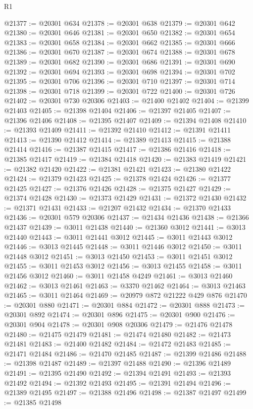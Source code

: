 \begin{lexlean}{R1}
\begin{coremodule}
@21377 := @20301 @634
@21378 := @20301 @638
@21379 := @20301 @642
@21380 := @20301 @646
@21381 := @20301 @650
@21382 := @20301 @654
@21383 := @20301 @658
@21384 := @20301 @662
@21385 := @20301 @666
@21386 := @20301 @670
@21387 := @20301 @674
@21388 := @20301 @678
@21389 := @20301 @682
@21390 := @20301 @686
@21391 := @20301 @690
@21392 := @20301 @694
@21393 := @20301 @698
@21394 := @20301 @702
@21395 := @20301 @706
@21396 := @20301 @710
@21397 := @20301 @714
@21398 := @20301 @718
@21399 := @20301 @722
@21400 := @20301 @726
@21402 := @20301 @730 @20306
@21403 := @21400 @21402
@21404 := @21399 @21403
@21405 := @21398 @21404
@21406 := @21397 @21405
@21407 := @21396 @21406
@21408 := @21395 @21407
@21409 := @21394 @21408
@21410 := @21393 @21409
@21411 := @21392 @21410
@21412 := @21391 @21411
@21413 := @21390 @21412
@21414 := @21389 @21413
@21415 := @21388 @21414
@21416 := @21387 @21415
@21417 := @21386 @21416
@21418 := @21385 @21417
@21419 := @21384 @21418
@21420 := @21383 @21419
@21421 := @21382 @21420
@21422 := @21381 @21421
@21423 := @21380 @21422
@21424 := @21379 @21423
@21425 := @21378 @21424
@21426 := @21377 @21425
@21427 := @21376 @21426
@21428 := @21375 @21427
@21429 := @21374 @21428
@21430 := @21373 @21429
@21431 := @21372 @21430
@21432 := @21371 @21431
@21433 := @21207 @21432
@21434 := @21370 @21433
@21436 := @20301 @579 @20306
@21437 := @21434 @21436
@21438 := @21366 @21437
@21439 := @3011 @21438
@21440 := @21360 @3012
@21441 := @3013 @21440
@21443 := @3011 @21441 @3012
@21445 := @3011 @21443 @3012
@21446 := @3013 @21445
@21448 := @3011 @21446 @3012
@21450 := @3011 @21448 @3012
@21451 := @3013 @21450
@21453 := @3011 @21451 @3012
@21455 := @3011 @21453 @3012
@21456 := @3013 @21455
@21458 := @3011 @21456 @3012
@21460 := @3011 @21458 @4249
@21461 := @3013 @21460
@21462 := @3013 @21461
@21463 := @3370 @21462
@21464 := @3013 @21463
@21465 := @3011 @21464
@21469 := @20979 @872 @21222 @429 @876
@21470 := @20301 @880
@21471 := @20301 @884
@21472 := @20301 @888
@21473 := @20301 @892
@21474 := @20301 @896
@21475 := @20301 @900
@21476 := @20301 @904
@21478 := @20301 @908 @20306
@21479 := @21476 @21478
@21480 := @21475 @21479
@21481 := @21474 @21480
@21482 := @21473 @21481
@21483 := @21400 @21482
@21484 := @21472 @21483
@21485 := @21471 @21484
@21486 := @21470 @21485
@21487 := @21399 @21486
@21488 := @21398 @21487
@21489 := @21397 @21488
@21490 := @21396 @21489
@21491 := @21395 @21490
@21492 := @21394 @21491
@21493 := @21393 @21492
@21494 := @21392 @21493
@21495 := @21391 @21494
@21496 := @21389 @21495
@21497 := @21388 @21496
@21498 := @21387 @21497
@21499 := @21385 @21498

\end{coremodule}
\end{lexlean}

